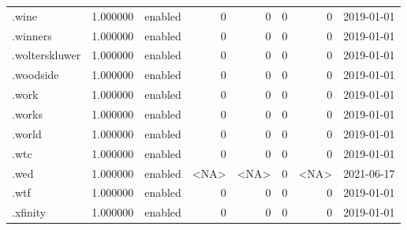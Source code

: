 \begin{tabular}{lrlrrrrl}
.wine                     &          1.000000 &         enabled &                           0 &                           0 &                           0 &                   0 &           2019-01-01 \\
.winners                  &          1.000000 &         enabled &                           0 &                           0 &                           0 &                   0 &           2019-01-01 \\
.wolterskluwer            &          1.000000 &         enabled &                           0 &                           0 &                           0 &                   0 &           2019-01-01 \\
.woodside                 &          1.000000 &         enabled &                           0 &                           0 &                           0 &                   0 &           2019-01-01 \\
.work                     &          1.000000 &         enabled &                           0 &                           0 &                           0 &                   0 &           2019-01-01 \\
.works                    &          1.000000 &         enabled &                           0 &                           0 &                           0 &                   0 &           2019-01-01 \\
.world                    &          1.000000 &         enabled &                           0 &                           0 &                           0 &                   0 &           2019-01-01 \\
.wtc                      &          1.000000 &         enabled &                           0 &                           0 &                           0 &                   0 &           2019-01-01 \\
.wed                      &          1.000000 &         enabled &                        <NA> &                        <NA> &                           0 &                <NA> &           2021-06-17 \\
.wtf                      &          1.000000 &         enabled &                           0 &                           0 &                           0 &                   0 &           2019-01-01 \\
.xfinity                  &          1.000000 &         enabled &                           0 &                           0 &                           0 &                   0 &           2019-01-01 \\

\end{tabular}
